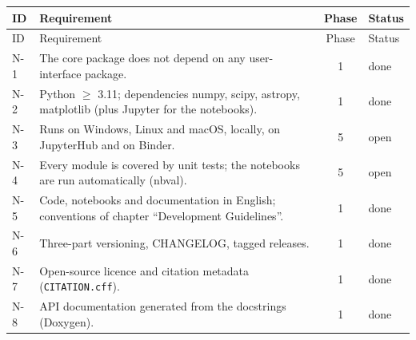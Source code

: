 \begin{longtable}{@{}l>{\raggedright\arraybackslash}p{8.6cm}cl@{}}
\toprule
ID & Requirement & Phase & Status \\
\midrule
\endfirsthead
\toprule
ID & Requirement & Phase & Status \\
\midrule
\endhead
\bottomrule
\endfoot
N-1 & The core package does not depend on any user-interface
  package. & 1 & done \\
N-2 & Python $\geq$ 3.11; dependencies numpy, scipy, astropy,
  matplotlib (plus Jupyter for the notebooks). & 1 & done \\
N-3 & Runs on Windows, Linux and macOS, locally, on JupyterHub and on
  Binder. & 5 & open \\
N-4 & Every module is covered by unit tests; the notebooks are run
  automatically (nbval). & 5 & open \\
N-5 & Code, notebooks and documentation in English; conventions of
  chapter \enquote{Development Guidelines}. & 1 & done \\
N-6 & Three-part versioning, CHANGELOG, tagged releases. & 1 & done \\
N-7 & Open-source licence and citation metadata
  (\texttt{CITATION.cff}). & 1 & done \\
N-8 & API documentation generated from the docstrings
  (Doxygen). & 1 & done \\
\end{longtable}

